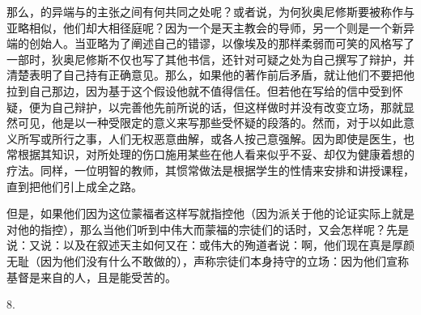 那么，的异端与的主张之间有何共同之处呢？或者说，为何狄奥尼修斯要被称作与亚略相似，他们却大相径庭呢？因为一个是天主教会的导师，另一个则是一个新异端的创始人。当亚略为了阐述自己的错谬，以像埃及的那样柔弱而可笑的风格写了一部时，狄奥尼修斯不仅也写了其他书信，还针对可疑之处为自己撰写了辩护，并清楚表明了自己持有正确意见。那么，如果他的著作前后矛盾，就让他们不要把他拉到自己那边，因为基于这个假设他就不值得信任。但若他在写给的信中受到怀疑，便为自己辩护，以完善他先前所说的话，但这样做时并没有改变立场，那就显然可见，他是以一种受限定的意义来写那些受怀疑的段落的。然而，对于以如此意义所写或所行之事，人们无权恶意曲解，或各人按己意强解。因为即使是医生，也常根据其知识，对所处理的伤口施用某些在他人看来似乎不妥、却仅为健康着想的疗法。同样，一位明智的教师，其惯常做法是根据学生的性情来安排和讲授课程，直到把他们引上成全之路。\par

\par

但是，如果他们因为这位蒙福者这样写就指控他（因为派关于他的论证实际上就是对他的指控），那么当他们听到中伟大而蒙福的宗徒们的话时，又会怎样呢？先是说：又说：以及在叙述天主如何又在：或伟大的殉道者说：啊，他们现在真是厚颜无耻（因为他们没有什么不敢做的），声称宗徒们本身持守的立场：因为他们宣称基督是来自的人，且是能受苦的。\par

8. \par

